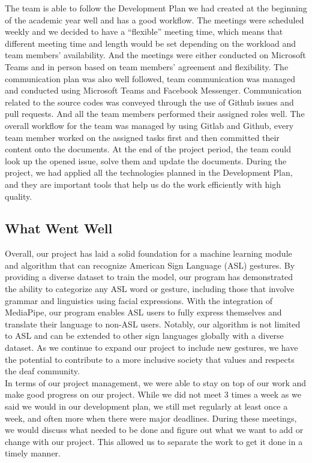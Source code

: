 \documentclass[12pt, titlepage]{article}
\begin{document}
The team is able to follow the Development Plan we had created at the beginning of the academic year well and has a good workflow. The meetings were scheduled weekly and we decided to have a “flexible” meeting time, which means that different meeting time and length would be set depending on the workload and team members’ availability. And the meetings were either conducted on Microsoft Teams and in person based on team members’ agreement and flexibility. The communication plan was also well followed, team communication was managed and conducted using Microsoft Teams and Facebook Messenger. Communication related to the source codes was conveyed through the use of Github issues and pull requests. And all the team members performed their assigned roles well. The overall workflow for the team was managed by using Gitlab and Github, every team member worked on the assigned tasks first and then committed their content onto the documents. At the end of the project period, the team could look up the opened issue, solve them and update the documents. During the project, we had applied all the technologies planned in the Development Plan, and they are important tools that help us do the work efficiently with high quality. 

\subsection{What Went Well}

Overall, our project has laid a solid foundation for a machine learning module and algorithm that can recognize American Sign Language (ASL) gestures. By providing a diverse dataset to train the model, our program has demonstrated the ability to categorize any ASL word or gesture, including those that involve grammar and linguistics using facial expressions. With the integration of MediaPipe, our program enables ASL users to fully express themselves and translate their language to non-ASL users. Notably, our algorithm is not limited to ASL and can be extended to other sign languages globally with a diverse dataset. As we continue to expand our project to include new gestures, we have the potential to contribute to a more inclusive society that values and respects the deaf community.\\

\noindent In terms of our project management, we were able to stay on top of our work and make good progress on our project. While we did not meet 3 times a week as we said we would in our development plan, we still met regularly at least once a week, and often more when there were major deadlines. During these meetings, we would discuss what needed to be done and figure out what we want to add or change with our project. This allowed us to separate the work to get it done in a timely manner.\\
\end{document}
